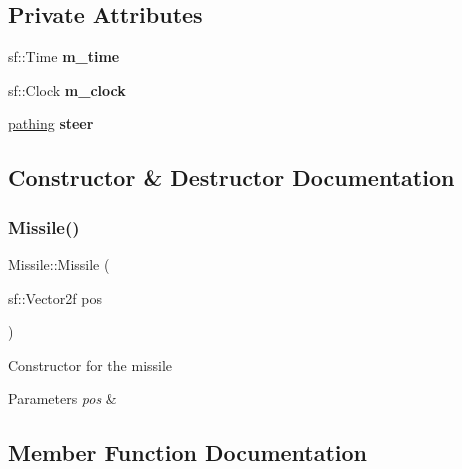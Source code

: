 \subsection*{Private Attributes}
\begin{DoxyCompactItemize}
\item 
\mbox{\label{class_missile_ac76d06b6e255d1dcd226fdc007832c8c}} 
sf\+::\+Time {\bfseries m\+\_\+time}
\item 
\mbox{\label{class_missile_ae81b6c01d6cacc8ac188a66274356430}} 
sf\+::\+Clock {\bfseries m\+\_\+clock}
\item 
\mbox{\label{class_missile_ace8827b3e211f866908a1e3112b0abc2}} 
\mbox{\hyperlink{structpathing}{pathing}} {\bfseries steer}
\end{DoxyCompactItemize}


\subsection{Constructor \& Destructor Documentation}
\mbox{\label{class_missile_afeeea0fd5a57b2fa5edfdccbb6ffeba1}} 
\subsubsection{\texorpdfstring{Missile()}{Missile()}}
{\footnotesize\ttfamily Missile\+::\+Missile (\begin{DoxyParamCaption}\item[{sf\+::\+Vector2f}]{pos }\end{DoxyParamCaption})}



Constructor for the missile 


\begin{DoxyParams}{Parameters}
{\em pos} & \\
\hline
\end{DoxyParams}


\subsection{Member Function Documentation}
\mbox{\label{class_missile_a0a101a13350fb8af75465e2cdcf01931}} 
